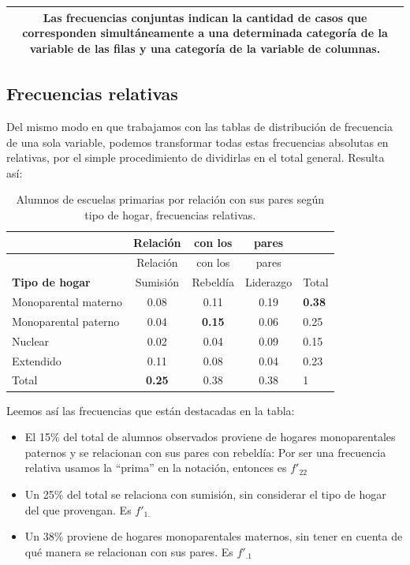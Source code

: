 \documentclass[]{book}
\begin{document}
\begin{longtable}[]{@{}c@{}}
\toprule
\endhead
\begin{minipage}[t]{0.97\columnwidth}\centering
Las \textbf{frecuencias conjuntas} indican la cantidad de casos que corresponden simultáneamente a una determinada categoría de la variable de las filas y una categoría de la variable de columnas.\strut
\end{minipage}\tabularnewline
\bottomrule
\end{longtable}

\hypertarget{frecuencias-relativas}{%
\subsection{Frecuencias relativas}\label{frecuencias-relativas}}

Del mismo modo en que trabajamos con las tablas de distribución de
frecuencia de una sola variable, podemos transformar todas estas
frecuencias absolutas en relativas, por el simple procedimiento de
dividirlas en el total general. Resulta así:

\begin{longtable}[]{@{}lcccl@{}}
\caption{\label{tab:unnamed-chunk-104}Alumnos de escuelas primarias por relación con sus pares según tipo de hogar, frecuencias relativas.}\tabularnewline
\toprule
& Relación & con los & pares &\tabularnewline
\midrule
\endfirsthead
\toprule
& Relación & con los & pares &\tabularnewline
\midrule
\endhead
\textbf{Tipo de hogar} & Sumisión & Rebeldía & Liderazgo & Total\tabularnewline
Monoparental materno & 0.08 & 0.11 & 0.19 & \textbf{0.38}\tabularnewline
Monoparental paterno & 0.04 & \textbf{0.15} & 0.06 & 0.25\tabularnewline
Nuclear & 0.02 & 0.04 & 0.09 & 0.15\tabularnewline
Extendido & 0.11 & 0.08 & 0.04 & 0.23\tabularnewline
Total & \textbf{0.25} & 0.38 & 0.38 & 1\tabularnewline
\bottomrule
\end{longtable}

Leemos así las frecuencias que están destacadas en la tabla:

\begin{itemize}
\item
  El 15\% del total de alumnos observados proviene de hogares
  monoparentales paternos y se relacionan con sus pares con rebeldía: Por ser una frecuencia relativa usamos la ``prima'' en la notación, entonces es \(f'_{22}\)
\item
  Un 25\% del total se relaciona con sumisión, sin considerar el tipo de hogar del que provengan. Es \(f'_{1.}\)
\item
  Un 38\% proviene de hogares monoparentales maternos, sin tener en cuenta de qué manera se relacionan con sus pares. Es \(f'_{.1}\)
\end{itemize}
\end{document}
